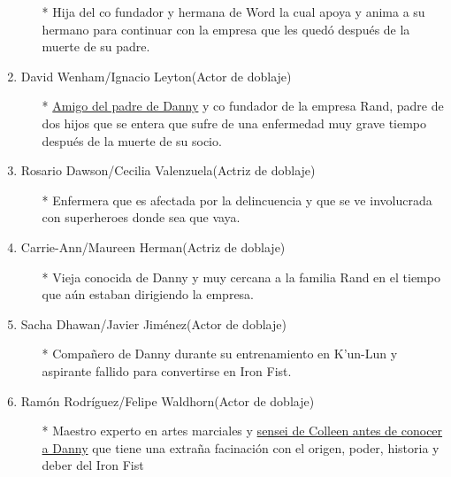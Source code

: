 \documentclass[a5paper, 11pt]{article}
\begin{document}
\begin{enumerate}
        \begin{itemize}
            \item[*] {}
            Hija del co fundador y hermana de Word la cual apoya y anima a su hermano para continuar con la empresa que les quedó después de la muerte de su padre.
            \end{itemize}
    \item David Wenham/Ignacio Leyton(Actor de doblaje)
        \begin{itemize}
            \item[*] {}
            {\underline{Amigo del padre de Danny}} y co fundador de la empresa Rand, padre de dos hijos que se entera que sufre de una enfermedad muy grave tiempo después de la muerte de su socio.
            \end{itemize}
    \item Rosario Dawson/Cecilia Valenzuela(Actriz de doblaje)
        \begin{itemize}
            \item[*] {}
            Enfermera que es afectada por la delincuencia y que se ve involucrada con superheroes donde sea que vaya.
            \end{itemize}
    \item Carrie-Ann/Maureen Herman(Actriz de doblaje)
        \begin{itemize}
            \item[*] {}
            Vieja conocida de Danny y muy cercana a la familia Rand en el tiempo que aún estaban dirigiendo la empresa.
            \end{itemize}
    \item Sacha Dhawan/Javier Jiménez(Actor de doblaje)
        \begin{itemize}
            \item[*] {}
            Compañero de Danny durante su entrenamiento en K'un-Lun y aspirante fallido para convertirse en Iron Fist.
            \end{itemize}
    \item Ramón Rodríguez/Felipe Waldhorn(Actor de doblaje)
        \begin{itemize}
            \item[*] {}
            Maestro experto en artes marciales y {\underline{sensei de Colleen antes de conocer a Danny}} que tiene una extraña facinación con el origen, poder, historia y deber del Iron Fist

\end{itemize}
\end{enumerate}
\end{document}
